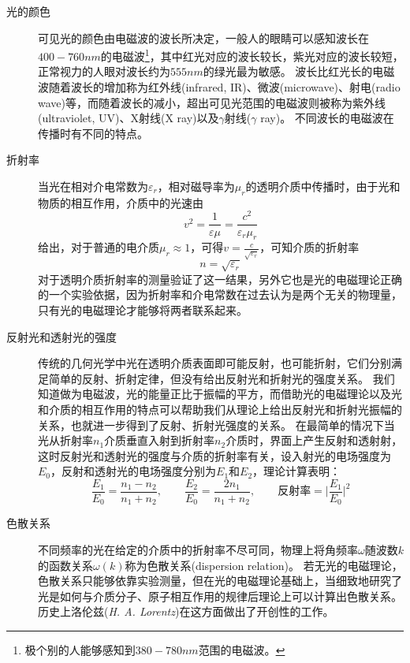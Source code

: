 \begin{description}
\item[{\heiti 光的颜色}] 可见光的颜色由电磁波的波长所决定，一般人的眼睛可以感知波长在$400-760\unit{nm}$的电磁波\footnote{极个别的人能够感知到$380-780\unit{nm}$范围的电磁波。}，其中红光对应的波长较长，紫光对应的波长较短，正常视力的人眼对波长约为$555\unit{nm}$的绿光最为敏感。
波长比红光长的电磁波随着波长的增加称为{\heiti 红外线}(infrared, IR)、{\heiti 微波}(microwave)、{\heiti 射电}(radio wave)等，而随着波长的减小，超出可见光范围的电磁波则被称为{\heiti 紫外线}(ultraviolet, UV)、{\heiti X射线}(X ray)以及{\heiti $\gamma$射线}($\gamma$ ray)。
不同波长的电磁波在传播时有不同的特点。

\item[{\heiti 折射率}] 当光在相对介电常数为$\varepsilon_r$，相对磁导率为$\mu_r$的透明介质中传播时，由于光和物质的相互作用，介质中的光速由
\begin{equation}
v^2 = \frac{1}{\varepsilon\mu} = \frac{c^2}{\varepsilon_r\mu_r}
\end{equation}
给出，对于普通的电介质$\mu_r\approx 1$，可得$v = \frac{c}{\sqrt{\varepsilon_r}}$，可知介质的折射率
\begin{equation}
n = \sqrt{\varepsilon_r}
\end{equation}
对于透明介质折射率的测量验证了这一结果，另外它也是光的电磁理论正确的一个实验依据，因为折射率和介电常数在过去认为是两个无关的物理量，只有光的电磁理论才能够将两者联系起来。

\item[{\heiti 反射光和透射光的强度}]
传统的几何光学中光在透明介质表面即可能反射，也可能折射，它们分别满足简单的反射、折射定律，但没有给出反射光和折射光的强度关系。
我们知道做为电磁波，光的能量正比于振幅的平方，而借助光的电磁理论以及光和介质的相互作用的特点可以帮助我们从理论上给出反射光和折射光振幅的关系，也就进一步得到了反射、折射光强度的关系。
在最简单的情况下当光从折射率$n_1$介质垂直入射到折射率$n_2$介质时，界面上产生反射和透射射，这时反射光和透射光的强度与介质的折射率有关，设入射光的电场强度为$E_0$，反射和透射光的电场强度分别为$E_1$和$E_2$，理论计算表明：
\begin{equation}\label{eqn: em-wave-反射率}
\frac{E_1}{E_0} = \frac{n_1-n_2}{n_1+n_2},\qquad \frac{E_2}{E_0} = \frac{2n_1}{n_1+n_2},\qquad \text{反射率} = \Bigg|\frac{E_1}{E_0}\Bigg|^2
\end{equation}

\item[{\heiti 色散关系}]
不同频率的光在给定的介质中的折射率不尽可同，物理上将角频率$\omega$随波数$k$的函数关系$\omega(k)$称为{\heiti 色散关系}(dispersion relation)。
若无光的电磁理论，色散关系只能够依靠实验测量，但在光的电磁理论基础上，当细致地研究了光是如何与介质分子、原子相互作用的规律后理论上可以计算出色散关系。历史上洛伦兹(\textit{H. A. Lorentz})在这方面做出了开创性的工作。
\end{description}



